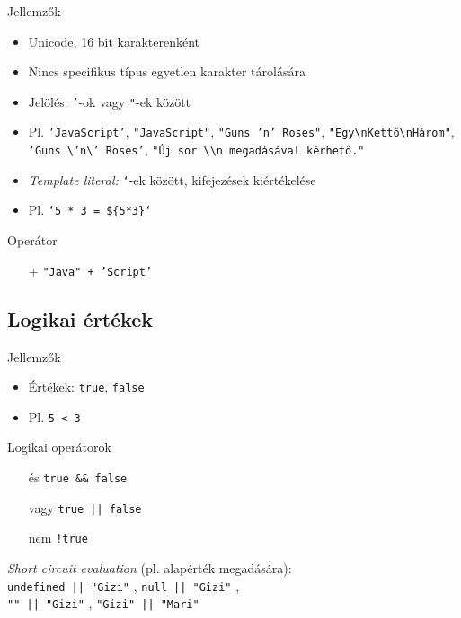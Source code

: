 \begin{frame}
    Jellemzők
    \begin{itemize}
        \item Unicode, 16 bit karakterenként
        \item Nincs specifikus típus egyetlen karakter tárolására
        \item Jelölés: \texttt{'}-ok vagy \texttt{"}-ek között
        \item Pl. \texttt{'JavaScript'}, \texttt{"JavaScript"}, \texttt{"Guns 'n' Roses"}, \texttt{"Egy\textbackslash nKettő\textbackslash nHárom"}, \texttt{'Guns \textbackslash 'n\textbackslash' Roses'}, \texttt{"Új sor \textbackslash\textbackslash n megadásával kérhető."}
        \item \emph{Template literal:} \texttt{`}-ek között, kifejezések kiértékelése
        \item Pl. \texttt{`5 * 3 = \$\{5*3\}`} 
    \end{itemize}
    \vfill
    Operátor
    \begin{itemize}
        \item[$+$] \texttt{"Java" + 'Script'} 
    \end{itemize}
\end{frame}

\subsection{Logikai értékek}

\begin{frame}
    Jellemzők
    \begin{itemize}
        \item Értékek: \texttt{true}, \texttt{false}
        \item Pl. \texttt{5 < 3} 
    \end{itemize}
    \vfill
    Logikai operátorok
    \begin{itemize}
        \item[és] \texttt{true \&\& false} 
        \item[vagy] \texttt{true || false} 
        \item[nem] \texttt{!true} 
    \end{itemize}
    \vfill
    \emph{Short circuit evaluation} (pl. alapérték megadására):\\ \qquad \texttt{undefined || "Gizi"} , \texttt{null || "Gizi"} , \\ \qquad \texttt{"" || "Gizi"} , \texttt{"Gizi" || "Mari"} 
\end{frame}

